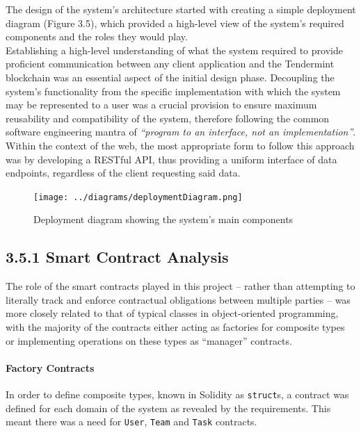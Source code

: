 \documentclass[12pt]{report}
\let\oldparagraph\paragraph
\renewcommand{\paragraph}[1]{\oldparagraph{#1}\mbox{}}
\begin{document}
The design of the system's architecture started with creating a simple
deployment diagram (Figure 3.5), which provided a high-level view of
the system's required components and the roles they would play.\\
Establishing a high-level understanding of what the system required to
provide proficient communication between any client application and the
Tendermint blockchain was an essential aspect of the initial design
phase. Decoupling the system's functionality from the specific
implementation with which the system may be represented to a user was a
crucial provision to ensure maximum reusability and compatibility of the
system, therefore following the common software engineering mantra of
\emph{``program to an interface, not an implementation''}\cite{1programtointerface}.
Within the context of the web, the most appropriate form to follow this
approach was by developing a RESTful\cite{1rest} API, thus providing a
uniform interface of data endpoints, regardless of the client requesting
said data.

\begin{figure}[htbp]
\centering
\texttt{[image: ../diagrams/deploymentDiagram.png]}
\caption{Deployment diagram showing the system's main components}
\end{figure}

\subsection{3.5.1 Smart Contract
Analysis}\label{smart-contract-analysis}

The role of the smart contracts played in this project -- rather than
attempting to literally track and enforce contractual obligations
between multiple parties -- was more closely related to that of typical
classes in object-oriented programming, with the
majority of the contracts either acting as
factories\cite{gamma1995design} for composite types or implementing
operations on these types as ``manager'' contracts.

\paragraph{Factory Contracts}\label{factory-contracts}

In order to define composite types, known in Solidity as
\texttt{struct}s, a contract was defined for each domain of the system
as revealed by the requirements. This meant there was a need for
\texttt{User}, \texttt{Team} and \texttt{Task} contracts.
\end{document}
